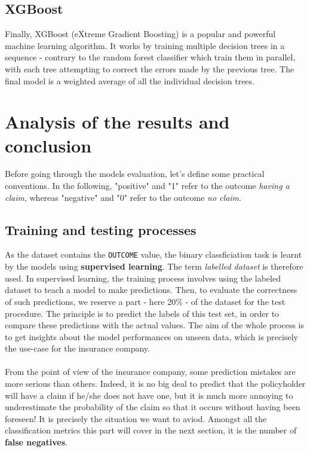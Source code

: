 \documentclass[a4paper,11pt, titlepage]{article}
\begin{document}
\subsection{XGBoost}

Finally, XGBoost (eXtreme Gradient Boosting) is a popular and powerful machine learning algorithm. It works by training multiple decision trees in a sequence - contrary to the random forest classifier which train them in parallel, with each tree attempting to correct the errors made by the previous tree. The final model is a weighted average of all the individual decision trees.



\section{Analysis of the results and conclusion} \label{results}

Before going through the models evaluation, let's define some practical conventions. In the following, "positive" and "1" refer to the outcome \textsl{having a claim}, whereas "negative" and "0" refer to the outcome \textsl{no claim}. 

\subsection{Training and testing processes}

As the dataset contains the {\tt OUTCOME} value, the binary classficiation task is learnt by the models using \textbf{supervised learning}. The term \textsl{labelled dataset} is therefore used. In supervised learning, the training process involves using the labeled dataset to teach a model to make predictions. Then, to evaluate the correctness of such predictions, we reserve a part - here 20\% - of the dataset for the test procedure. The principle is to predict the labels of this test set, in order to compare these predictions with the actual values. The aim of the whole process is to get insights about the model performances on unseen data, which is precisely the use-case for the insurance company.\\
\\
\noindent From the point of view of the insurance company, some prediction mistakes are more serious than others. Indeed, it is no big deal to predict that the policyholder will have a claim if he/she does not have one, but it is much more annoying to underestimate the probability of the claim so that it occurs without having been foreseen! It is precisely the situation we want to aviod. Amongst all the classification metrics this part will cover in the next section, it is the number of \textbf{false negatives}.
\end{document}
